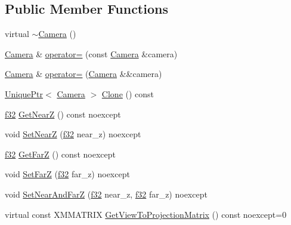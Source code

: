 \subsection*{Public Member Functions}
\begin{DoxyCompactItemize}
\item 
virtual \hyperlink{classmage_1_1_camera_aa4718c93578d160299bdc24039cc256f}{$\sim$\+Camera} ()
\item 
\hyperlink{classmage_1_1_camera}{Camera} \& \hyperlink{classmage_1_1_camera_a9ae561f9cc0ed0dd855ee1d824dad090}{operator=} (const \hyperlink{classmage_1_1_camera}{Camera} \&camera)
\item 
\hyperlink{classmage_1_1_camera}{Camera} \& \hyperlink{classmage_1_1_camera_a83e33f57394e85eee58745eb8e05b282}{operator=} (\hyperlink{classmage_1_1_camera}{Camera} \&\&camera)
\item 
\hyperlink{namespacemage_a3316d7143a973e37adf1110f2e80ca31}{Unique\+Ptr}$<$ \hyperlink{classmage_1_1_camera}{Camera} $>$ \hyperlink{classmage_1_1_camera_a830e9a071449f1026fd43fcd19577e6c}{Clone} () const
\item 
\hyperlink{namespacemage_a6a44ad388483959dc4dff9f2aef91431}{f32} \hyperlink{classmage_1_1_camera_ae1af2a2f2e6ba144c75b1b75ca64c8da}{Get\+NearZ} () const noexcept
\item 
void \hyperlink{classmage_1_1_camera_aff49a60d056a2e625bbe652443a0d7f8}{Set\+NearZ} (\hyperlink{namespacemage_a6a44ad388483959dc4dff9f2aef91431}{f32} near\+\_\+z) noexcept
\item 
\hyperlink{namespacemage_a6a44ad388483959dc4dff9f2aef91431}{f32} \hyperlink{classmage_1_1_camera_a1e58333595c327f78b2c1b83dd2c3645}{Get\+FarZ} () const noexcept
\item 
void \hyperlink{classmage_1_1_camera_adadd1afb821048429602bde76171ea05}{Set\+FarZ} (\hyperlink{namespacemage_a6a44ad388483959dc4dff9f2aef91431}{f32} far\+\_\+z) noexcept
\item 
void \hyperlink{classmage_1_1_camera_a90bfe6b0f74fe8362175b9bec41c4fe8}{Set\+Near\+And\+FarZ} (\hyperlink{namespacemage_a6a44ad388483959dc4dff9f2aef91431}{f32} near\+\_\+z, \hyperlink{namespacemage_a6a44ad388483959dc4dff9f2aef91431}{f32} far\+\_\+z) noexcept
\item 
virtual const X\+M\+M\+A\+T\+R\+IX \hyperlink{classmage_1_1_camera_ad3e8380ba9718a983f72d753d08f556e}{Get\+View\+To\+Projection\+Matrix} () const noexcept=0
\end{DoxyCompactItemize}

